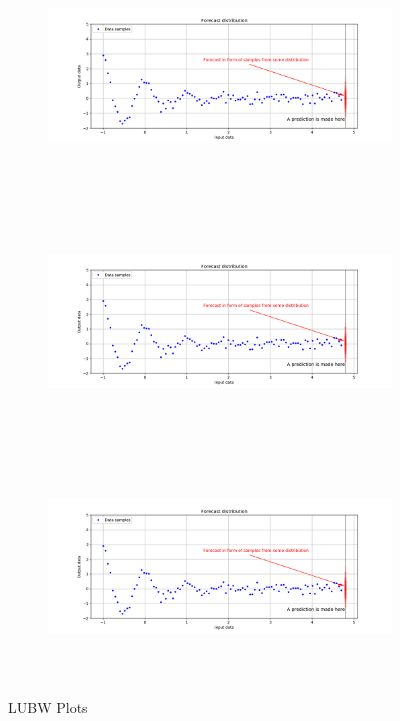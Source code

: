 \documentclass[12pt,a4paper,twoside]{scrartcl}
\numberwithin{equation}{section}
\begin{document}
\begin{figure}[H]
  \begin{subfigure}{0.32\textwidth}
    \includegraphics[width=\textwidth,height=6cm]{figures/forecast.png}%
    \label{fig:y equals x}
  \end{subfigure}
  \begin{subfigure}{0.32\textwidth}
    \includegraphics[width=\textwidth,height=6cm]{figures/forecast.png}%
    \label{fig:y equals x}
  \end{subfigure}
  \begin{subfigure}{0.32\textwidth}
    \includegraphics[width=\textwidth,height=6cm]{figures/forecast.png}%
    \label{fig:y equals x}
  \end{subfigure}      
    \caption{LUBW Plots}
  \end{figure}
  
\end{document}
